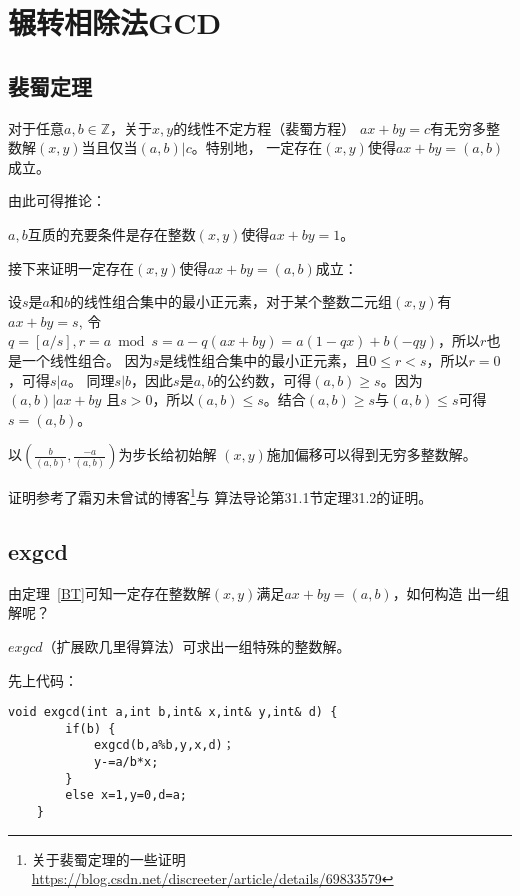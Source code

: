 \section{辗转相除法GCD}
\subsection{裴蜀定理}
\begin{theorem}\label{BT}
	对于任意$a,b\in \mathbb{Z}$，关于$x,y$的线性不定方程（裴蜀方程）
	$ax+by=c$有无穷多整数解$(x,y)$当且仅当$(a,b)|c$。特别地，
	一定存在$(x,y)$使得$ax+by=(a,b)$成立。
\end{theorem}

由此可得推论：

\begin{inference}
	$a,b$互质的充要条件是存在整数$(x,y)$使得$ax+by=1$。
\end{inference}

接下来证明一定存在$(x,y)$使得$ax+by=(a,b)$成立：

设$s$是$a$和$b$的线性组合集中的最小正元素，对于某个整数二元组$(x,y)$有$ax+by=s$,
令$q=[a/s],r=a \bmod s=a-q(ax+by)=a(1-qx)+b(-qy)$，所以$r$也是一个线性组合。
因为$s$是线性组合集中的最小正元素，且$0\leq r < s$，所以$r=0$，可得$s|a$。
同理$s|b$，因此$s$是$a,b$的公约数，可得$(a,b) \geq s$。因为$(a,b)|ax+by$
且$s>0$，所以$(a,b) \leq s$。结合$(a,b) \geq s$与$(a,b) \leq s$可得
$s=(a,b)$。

以$(\frac{b}{(a,b)},\frac{-a}{(a,b)})$为步长给初始解
$(x,y)$施加偏移可以得到无穷多整数解。

证明参考了霜刃未曾试的博客\footnote{关于裴蜀定理的一些证明\\
	\url{https://blog.csdn.net/discreeter/article/details/69833579}}与
算法导论\cite{ITA3}第31.1节定理31.2的证明。
\subsection{exgcd}
由定理~\ref{BT}可知一定存在整数解$(x,y)$满足$ax+by=(a,b)$，如何构造
出一组解呢？

$exgcd$（扩展欧几里得算法）可求出一组特殊的整数解。

先上代码：

\begin{lstlisting}[title=exgcd]
    void exgcd(int a,int b,int& x,int& y,int& d) {
        if(b) {
            exgcd(b,a%b,y,x,d)；
            y-=a/b*x;
        }
        else x=1,y=0,d=a;
    }
\end{lstlisting}

